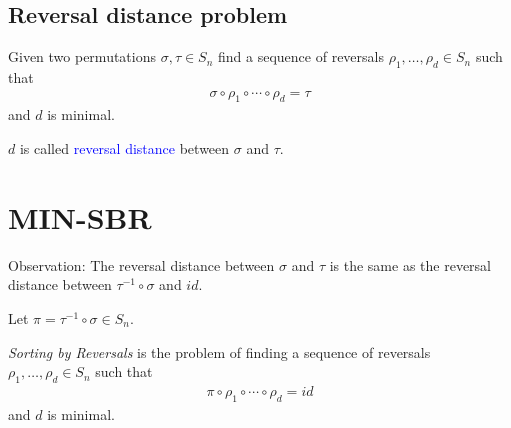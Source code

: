 \documentclass{beamer}
\theoremstyle{definition}
\def\padding{\vspace{0.5cm}}
\def\b{\textcolor{blue}}
\begin{document}
\subsection{Reversal distance problem}

\begin{frame}

\begin{definition}
Given two permutations $\sigma, \tau \in S_n$ find a sequence of reversals $\rho_1, \dots, \rho_d \in S_n$ such that
\begin{align*}
    \sigma \circ \rho_1 \circ \cdots \circ \rho_d = \tau
\end{align*}
and $d$ is minimal. \pause\par\padding
$d$ is called \b{reversal distance} between $\sigma$ and $\tau$.
\end{definition}

\end{frame}

\section{MIN-SBR}

\begin{frame}

Observation: The reversal distance between $\sigma$ and $\tau$ is the same as the reversal distance between $\tau^{-1} \circ \sigma$ and $id$. \pause\padding

\begin{definition}
Let $\pi = \tau^{-1} \circ \sigma \in S_n$. \par\pause
\textit{Sorting by Reversals} is the problem of finding a sequence of reversals $\rho_1, \dots, \rho_d \in S_n$ such that
\begin{align*}
    \pi \circ \rho_1 \circ \cdots \circ \rho_d = id
\end{align*}
and $d$ is minimal.
\end{definition}

\end{frame}
\end{document}
